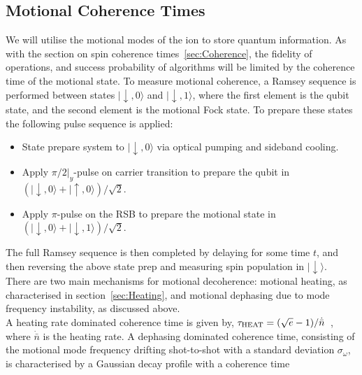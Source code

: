 \subsection{Motional Coherence Times}
\label{sec:Motional Coherence}
    We will utilise the motional modes of the ion to store quantum information.
    As with the section on spin coherence times~\ref{sec:Coherence}, the
    fidelity of operations, and success probability of algorithms will be
    limited by the coherence time of the motional state.  To measure motional
    coherence, a Ramsey sequence is performed between states $|\downarrow, 0
    \rangle$ and $|\downarrow, 1 \rangle$, where the first element is the qubit
    state, and the second element is the motional Fock state. To prepare these
    states the following pulse sequence is applied:
    \begin{itemize}
    \item State prepare system to $|\downarrow, 0\rangle$ via optical pumping and sideband cooling.
    \item Apply $\pi/2|_y$-pulse on carrier transition to prepare the qubit in $(|\downarrow, 0\rangle + |\uparrow, 0\rangle)/\sqrt{2}$.
    \item Apply $\pi$-pulse on the RSB to prepare the motional state in $(|\downarrow, 0\rangle + |\downarrow, 1\rangle)/\sqrt{2}$.
    \end{itemize}
    The full Ramsey sequence is then completed by delaying for some time $t$,
    and then reversing the above state prep and measuring spin population in
    $|\downarrow\rangle$. \\
    There are two main mechanisms for motional decoherence: motional heating, as
    characterised in section~\ref{sec:Heating}, and motional dephasing due to
    mode frequency instability, as discussed above. \\
    A heating rate dominated coherence time is given by, $\tau_{\rm HEAT} =
    (\sqrt{e}-1)/\dot{\bar{n}}$~\cite{}, where $\dot{\bar{n}}$ is the heating
    rate. A dephasing dominated coherence time, consisting of the
    motional mode frequency drifting shot-to-shot with a standard deviation
    $\sigma_{\omega}$, is characterised by a Gaussian decay profile with a coherence time
